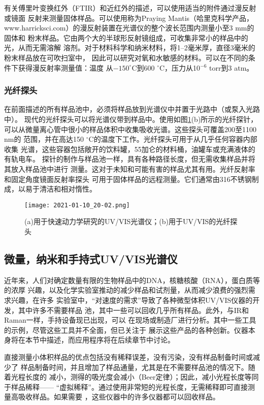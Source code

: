 有关傅里叶变换红外（FTIR）和近红外的描述，可以使用适当的附件通过漫反射或镜面
反射来测量固体样品。可以使用称为Praying Mantis（哈里克科学产品，
www.harricksci.com）的漫反射装置在光谱仪的整个波长范围内测量小至3 mm的固体和
粉末样品。它由两个大的半球形反射镜组成，可收集非常小的样品中的光，从而无需溶解
溶剂。对于材料科学和纳米材料，将1--2毫米厚，直径3毫米的粉末样品放在可吹扫室中，
因此可以研究对氧和水敏感的材料。可以在不同的条件下获得漫反射率测量值：温度
从$- 150^\circ$C到600 $^\circ$C，压力从10$^{-6}$ torr到3 atm。
\subsubsection{光纤探头}
在前面描述的所有样品池中，必须将样品放到光谱仪中并置于光路中（或泵入光路中）。
现代的光纤探头可以将光谱仪带到样品中。使用如图\ref{fig:5.29}(b)所示的光纤探针，
可以从微量离心管中很小的样品体积中收集吸收光谱。这些探头可覆盖200至1100 nm的
范围，并在高达150 $^\circ$C的温度下工作。光纤探头可用于从几乎任何容器内部收集
光谱，这些容器包括敞开的饮料罐，55加仑的材料桶，油罐车或充满液体的有轨电车。
探针的制作与样品池一样，具有各种路径长度，但无需收集样品并将其放入样品池中进行
测量。这对于未知和可能有害的样品尤其有用。光纤反射率和固定角度镜面反射率探头
可用于固体样品的远程测量。它们通常由316不锈钢制成，以易于清洁和相对惰性。
\begin{figure}[htpb]
    \centering
    \texttt{[image: 2021-01-10\_20-02.png]}
    \caption{(a)用于快速动力学研究的UV/VIS光谱仪；(b)用于UV/VIS的光纤探头}
    \label{fig:5.29}
\end{figure}
\subsection{微量，纳米和手持式UV/VIS光谱仪}
近年来，人们对确定数量有限的生物样品中的DNA，核糖核酸（RNA），蛋白质等的浓厚
兴趣，以及化学实验室推动的减少样品和试剂量，从而减少浪费的强烈需求兴趣，在许多
实验室中，“对速度的需求”导致了各种微型体积UV/VIS仪器的开发，其中许多不需要样品
池，其中一些可以回收几乎所有样品。此外，与IR和Raman一样，手持设备现已出现，可以
在现场或制造厂进行分析。其中一些工具的示例，尽管这些工具并不全面，但已关注于
展示这些产品的各种创新。仪器本身将在本节中描述，而应用程序将在后续章节中讨论。

直接测量小体积样品的优点包括没有稀释误差，没有污染，没有样品制备时间或减少了
样品制备时间，并且增加了样品通量，尤其是在不需要样品池的情况下。随着光程长度的
减小，测得的吸光度会减小（Beer定律）；因此，减小光程长度等同于样品稀释——
“虚拟稀释”。通过使用非常短的光程长度，无需稀释即可直接测量高吸收样品。如果需要
，这些仪器中的许多仪器都可以回收样品。

